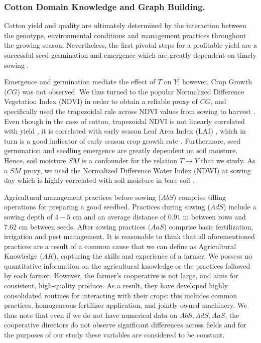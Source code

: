\documentclass[letterpaper]{article} %
\begin{document}
\subsubsection{Cotton Domain Knowledge and Graph Building.}

Cotton yield and quality are ultimately determined by the interaction between the genotype, environmental conditions and management practices throughout the growing season. Nevertheless, the first pivotal steps for a profitable yield are a successful seed germination and emergence which are greatly dependent on timely sowing \cite{wanjura1969emergence, bauer1998planting,  bradow2010germination}.

Emergence and germination mediate the effect of $T$ on $Y$; however, Crop Growth ($CG$) was not observed. We thus turned to the popular Normalized Difference Vegetation Index (NDVI) in order to obtain a reliable proxy of $CG$, and specifically used the trapezoidal rule across NDVI values from sowing to harvest %
\cite{eklundh2015timesat}. Even though in the case of cotton, trapezoidal NDVI is not linearly correlated with yield \cite{dalezios2001cotton, zhao2007canopy}, it is correlated with early season Leaf Area Index (LAI) \cite{zhao2007canopy}, which in turn is a good indicator of early season crop growth rate \cite{virk2019physiological}.
Furthermore, seed germination and seedling emergence are greatly dependent on soil moisture. Hence, soil moisture $SM$ is a confounder for the relation $T \rightarrow Y$ that we study. As a $SM$ proxy, we used the Normalized Difference Water Index (NDWI) at sowing day which is highly correlated with soil moisture in bare soil \cite{casamitjana2020soil}. 

Agricultural management practices before sowing ($AbS$) comprise tilling operations for preparing a good seedbed. Practices during sowing ($AdS$) include a sowing depth of $4-5$ cm and an average distance of $0.91$ m between rows and $7.62$ cm between seeds. After sowing practices ($AaS$) comprise basic fertilization, irrigation and pest management. It is reasonable to think that all aforementioned practices are a result of a common cause that we can define as Agricultural Knowledge ($AK$), capturing the skills and experience of a farmer. We possess no quantitative information on the agricultural knowledge or the practices followed by each farmer. However, the farmer's cooperative is not large, and aims for consistent, high-quality produce. As a result, they have developed highly consolidated routines for interacting with their crops: this includes common practices, homogeneous fertilizer application, and jointly owned machinery. We thus note that even if we do not have numerical data on $AbS, AdS, AaS$, the cooperative directors do not observe significant differences across fields and for the purposes of our study these variables are considered to be constant. 
\end{document}

